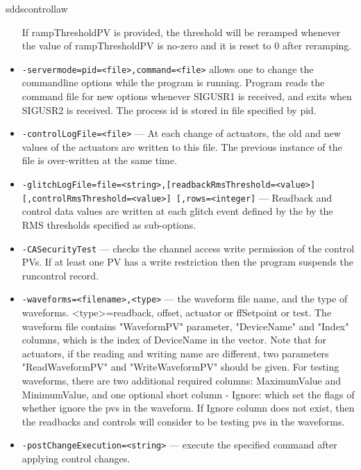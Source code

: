 \begin{sddsprog}{sddscontrollaw}
\begin{itemize}
               If rampThresholdPV is provided, the threshold will be reramped whenever
               the value of rampThresholdPV is no-zero and it is reset to 0 after reramping.
  \item {\tt -servermode=pid=<file>,command=<file>}     allows one to change the commandline options while the program is
               running. Program reads the command file for new options whenever
               SIGUSR1 is received, and exits when SIGUSR2 is received.
               The process id is stored in file specified by pid.
  \item {\tt -controlLogFile=<file>} --- At each change of actuators, the old and new values of the actuators
               are written to this file. The previous instance of the file
               is over-written at the same time.
  \item {\tt -glitchLogFile=file=<string>,[readbackRmsThreshold=<value>][,controlRmsThreshold=<value>]
                 [,rows=<integer]} ---
                  Readback and control data values
               are written at each glitch event defined by the
               by the RMS thresholds specified as sub-options.
  \item {\tt -CASecurityTest} --- checks the channel access write permission of the control PVs.
               If at least one PV has a write restriction then the program suspends
               the runcontrol record.
  \item {\tt -waveforms=<filename>,<type>} --- the waveform file name, and the type of
               waveforms. <type>=readback, offset, actuator or ffSetpoint or test.
               The waveform file contains "WaveformPV" parameter,
               "DeviceName" and "Index" columns, which is the index of DeviceName in
               the vector. Note that for actuators, if the reading and writing name are
               different, two parameters "ReadWaveformPV" and "WriteWaveformPV"
               should be given. For testing waveforms, there are two additional required columns:
               MaximumValue and MinimumValue, and one optional short column - Ignore:
               which set the flags of whether ignore the pvs in the waveform. If Ignore column
               does not exist, then the readbacks and controls will consider to be testing pvs
               in the waveforms.
  \item {\tt -postChangeExecution=<string>} --- execute the specified command after applying control changes.
\end{itemize}


\end{sddsprog}
